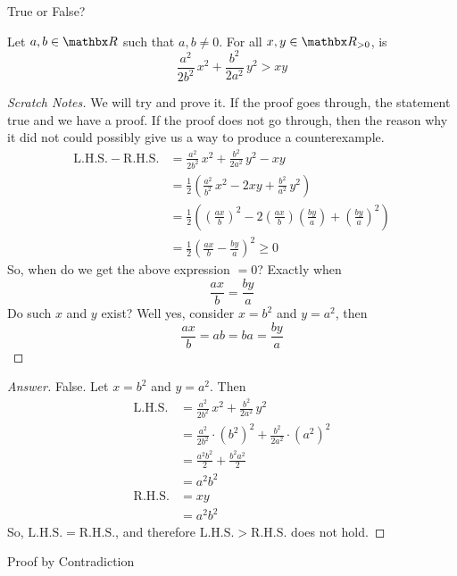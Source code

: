 \vspace*{1em}

\begin{example}
True or False?
\item[] Let $a,b \in \rr$ such that $a,b \neq 0$. For all $x,y \in \rr_{>0}$, is
\[\frac{a^2}{2b^2}\,x^2 + \frac{b^2}{2a^2}\,y^2 > xy\]
\end{example}
\begin{proof}[Scratch Notes]
\renewcommand{\qed}{}
We will try and prove it. If the proof goes through, the statement true and we have a proof. If the proof does not go through, then the reason why it did not could possibly give us a way to produce a counterexample.\newpage
\begin{align*}
\mathrm{L.H.S.} - \mathrm{R.H.S.} &= \frac{a^2}{2b^2}\,x^2 + \frac{b^2}{2a^2}\,y^2 - xy\\[0.5em]
 &= \frac{1}{2}\left(\frac{a^2}{b^2}\,x^2 - 2xy + \frac{b^2}{a^2}\,y^2\right)\\[0.5em]
 &= \frac{1}{2}\left(\left(\frac{ax}{b}\right)^2 - 2\left(\frac{ax}{b}\right)\left(\frac{by}{a}\right) + \left(\frac{by}{a}\right)^2\right)\\[0.5em]
 &= \frac{1}{2}\left(\frac{ax}{b} - \frac{by}{a}\right)^2 \geq 0
\end{align*}
So, when do we get the above expression $=0$? Exactly when
\[\frac{ax}{b} = \frac{by}{a}\]
Do such $x$ and $y$ exist? Well yes, consider $x = b^2$ and $y = a^2$, then
\[\frac{ax}{b} = ab = ba = \frac{by}{a}\]
\end{proof}
\begin{proof}[Answer]
False. Let $x = b^2$ and $y = a^2$. Then
\begin{align*}
\mathrm{L.H.S.} &= \frac{a^2}{2b^2}\,x^2 + \frac{b^2}{2a^2}\,y^2\\[0.5em]
 &= \frac{a^2}{2b^2}\cdot (b^2)^2 + \frac{b^2}{2a^2}\cdot (a^2)^2\\[0.5em]
 &= \frac{a^2b^2}{2} + \frac{b^2a^2}{2}\\[0.5em]
 &= a^2b^2\\[1em]
\mathrm{R.H.S.} &= xy\\[0.5em]
 &= a^2b^2
\end{align*}
So, $\mathrm{L.H.S.} = \mathrm{R.H.S.}$, and therefore $\mathrm{L.H.S.} > \mathrm{R.H.S.}$ does not hold.
\end{proof}

\vspace*{2em}

\begin{mdframed}
\begin{center}
{\Large Proof by Contradiction}
\end{center}
\end{mdframed}

